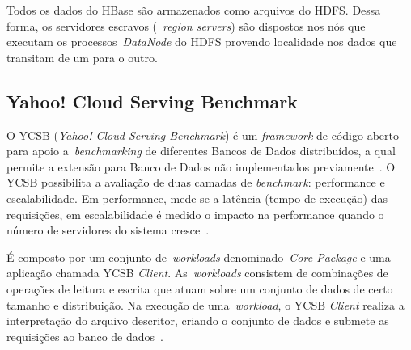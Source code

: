 \documentclass[12pt]{article}
\begin{document}


Todos os dados do HBase são armazenados como arquivos do HDFS. Dessa forma, os servidores escravos (~\emph{region servers}) são dispostos nos nós que executam os processos~\emph{DataNode} do HDFS provendo localidade nos dados que transitam de um para o outro.


\subsection{Yahoo! Cloud Serving Benchmark}
\label{subsec:ycsb}

O YCSB (\emph{Yahoo! Cloud Serving Benchmark}) é um \textit{framework} de código-aberto para apoio a~\emph{benchmarking} de diferentes Bancos de Dados distribuídos, a qual permite a extensão para Banco de Dados não implementados previamente~\cite{cooper2010benchmarking}. O YCSB possibilita a avaliação de duas camadas de \textit{benchmark}: performance e escalabilidade. Em performance, mede-se a latência (tempo de execução) das requisições, em escalabilidade é medido o impacto na performance quando o número de servidores do sistema cresce~\cite{cooper2010benchmarking}.

É composto por um conjunto de~\emph{workloads} denominado~\emph{Core Package} e uma aplicação chamada YCSB \textit{Client}. As~\emph{workloads} consistem de combinações de operações de leitura e escrita que atuam sobre um conjunto de dados de certo tamanho e distribuição. Na execução de uma~\emph{workload}, o YCSB \textit{Client} realiza a interpretação do arquivo descritor, criando o conjunto de dados e submete as requisições ao banco de dados~\cite{cooper2010benchmarking}. 
\end{document}
